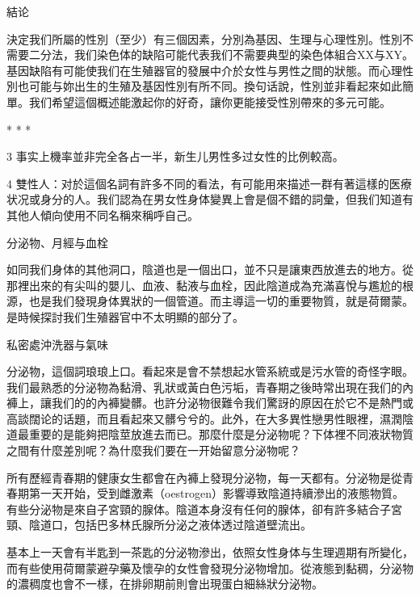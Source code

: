 \documentclass[12pt,UTF8]{ctexbook}
\begin{document}
結论




決定我们所屬的性別（至少）有三個因素，分別為基因、生理与心理性別。性別不需要二分法，我们染色体的缺陷可能代表我们不需要典型的染色体組合XX与XY。基因缺陷有可能使我们在生殖器官的發展中介於女性与男性之間的狀態。而心理性別也可能与妳出生的生殖及基因性別有所不同。換句话說，性別並非看起來如此簡單。我们希望這個概述能激起你的好奇，讓你更能接受性別帶來的多元可能。





* * *



3	事实上機率並非完全各占一半，新生儿男性多过女性的比例較高。



4	雙性人：对於這個名詞有許多不同的看法，有可能用來描述一群有著這樣的医療状况或身分的人。我们認為在男女性身体變異上會是個不錯的詞彙，但我们知道有其他人傾向使用不同名稱來稱呼自己。





分泌物、月經与血栓





如同我们身体的其他洞口，陰道也是一個出口，並不只是讓東西放進去的地方。從那裡出來的有尖叫的嬰儿、血液、黏液与血栓，因此陰道成為充滿喜悅与尷尬的根源，也是我们發現身体異狀的一個管道。而主導這一切的重要物質，就是荷爾蒙。是時候探討我们生殖器官中不太明顯的部分了。





私密處沖洗器与氣味




分泌物，這個詞琅琅上口。看起來是會不禁想起水管系統或是污水管的奇怪字眼。我们最熟悉的分泌物為黏滑、乳狀或黃白色污垢，青春期之後時常出現在我们的內褲上，讓我们的的內褲變髒。也許分泌物很難令我们驚訝的原因在於它不是熱門或高談闊论的话題，而且看起來又髒兮兮的。此外，在大多異性戀男性眼裡，濕潤陰道最重要的是能夠把陰莖放進去而已。那麼什麼是分泌物呢？下体裡不同液狀物質之間有什麼差別呢？為什麼我们要在一开始留意分泌物呢？

所有歷經青春期的健康女生都會在內褲上發現分泌物，每一天都有。分泌物是從青春期第一天开始，受到雌激素（oestrogen）影響導致陰道持續滲出的液態物質。有些分泌物是來自子宮頸的腺体。陰道本身沒有任何的腺体，卻有許多結合子宮頸、陰道口，包括巴多林氏腺所分泌之液体透过陰道壁流出。

基本上一天會有半匙到一茶匙的分泌物滲出，依照女性身体与生理週期有所變化，而有些使用荷爾蒙避孕藥及懷孕的女性會發現分泌物增加。從液態到黏稠，分泌物的濃稠度也會不一樣，在排卵期前則會出現蛋白細絲狀分泌物。
\end{document}
